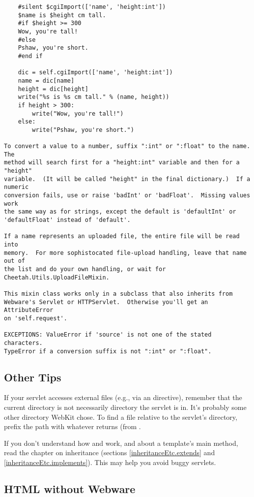 \begin{verbatim}
    #silent $cgiImport(['name', 'height:int'])
    $name is $height cm tall.
    #if $height >= 300
    Wow, you're tall!
    #else
    Pshaw, you're short.
    #end if

    dic = self.cgiImport(['name', 'height:int'])
    name = dic[name]
    height = dic[height]
    write("%s is %s cm tall." % (name, height))
    if height > 300:
        write("Wow, you're tall!")
    else:
        write("Pshaw, you're short.")

To convert a value to a number, suffix ":int" or ":float" to the name.  The
method will search first for a "height:int" variable and then for a "height"
variable.  (It will be called "height" in the final dictionary.)  If a numeric
conversion fails, use or raise 'badInt' or 'badFloat'.  Missing values work
the same way as for strings, except the default is 'defaultInt' or
'defaultFloat' instead of 'default'.

If a name represents an uploaded file, the entire file will be read into 
memory.  For more sophistocated file-upload handling, leave that name out of
the list and do your own handling, or wait for Cheetah.Utils.UploadFileMixin.

This mixin class works only in a subclass that also inherits from 
Webware's Servlet or HTTPServlet.  Otherwise you'll get an AttributeError
on 'self.request'.

EXCEPTIONS: ValueError if 'source' is not one of the stated characters.
TypeError if a conversion suffix is not ":int" or ":float".
\end{verbatim}

\subsection{Other Tips}
\label{webware.otherTips}

If your servlet accesses external files (e.g., via an 
directive), remember that the current directory is not necessarily directory
the servlet is in.  It's probably some other directory WebKit chose.  To find a
file relative to the servlet's directory, prefix the path with whatever
 returns (from .

If you don't understand how  and  work, and
about a template's main method, read the chapter on inheritance (sections
\ref{inheritanceEtc.extends} and \ref{inheritanceEtc.implements}).  This may
help you avoid buggy servlets.

\subsection{HTML without Webware}
\label{webware.not}


